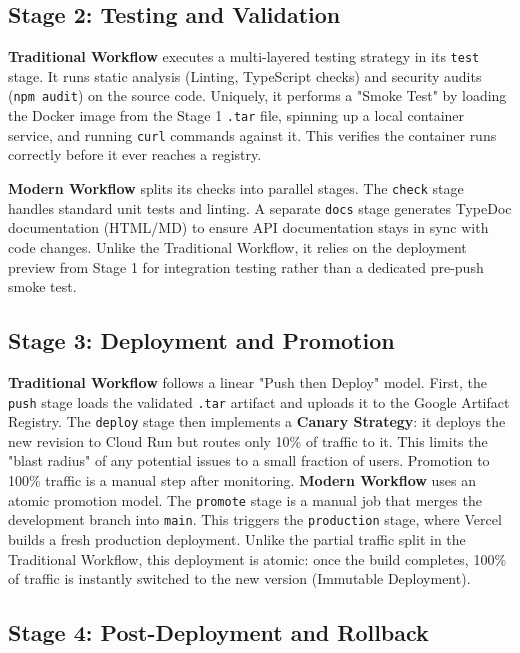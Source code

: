 \documentclass[a4paper,12pt]{report}
\begin{document}
\subsection{Stage 2: Testing and Validation}

\textbf{Traditional Workflow} executes a multi-layered testing strategy in its \texttt{test} stage. It runs static analysis (Linting, TypeScript checks) and security audits (\texttt{npm audit}) on the source code. Uniquely, it performs a "Smoke Test" by loading the Docker image from the Stage 1 \texttt{.tar} file, spinning up a local container service, and running \texttt{curl} commands against it. This verifies the container runs correctly before it ever reaches a registry.

\textbf{Modern Workflow} splits its checks into parallel stages. The \texttt{check} stage handles standard unit tests and linting. A separate \texttt{docs} stage generates TypeDoc documentation (HTML/MD) to ensure API documentation stays in sync with code changes. Unlike the Traditional Workflow, it relies on the deployment preview from Stage 1 for integration testing rather than a dedicated pre-push smoke test.

\subsection{Stage 3: Deployment and Promotion}

\textbf{Traditional Workflow} follows a linear "Push then Deploy" model. First, the \texttt{push} stage loads the validated \texttt{.tar} artifact and uploads it to the Google Artifact Registry. The \texttt{deploy} stage then implements a \textbf{Canary Strategy}: it deploys the new revision to Cloud Run but routes only 10\% of traffic to it. This limits the "blast radius" of any potential issues to a small fraction of users. Promotion to 100\% traffic is a manual step after monitoring.
\textbf{Modern Workflow} uses an atomic promotion model. The \texttt{promote} stage is a manual job that merges the development branch into \texttt{main}. This triggers the \texttt{production} stage, where Vercel builds a fresh production deployment. Unlike the partial traffic split in the Traditional Workflow, this deployment is atomic: once the build completes, 100\% of traffic is instantly switched to the new version (Immutable Deployment).

\subsection{Stage 4: Post-Deployment and Rollback}
\end{document}
